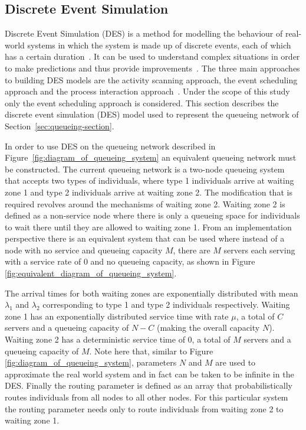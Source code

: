\subsection{Discrete Event Simulation}

Discrete Event Simulation (DES) is a method for modelling the behaviour of
real-world systems in which the system is made up of discrete events, each of
which has a certain duration~\cite{DESstewart}.
It can be used to understand complex situations in order to make predictions
and thus provide improvements~\cite{VinceGeraintBook}.
The three main approaches to building DES models are the activity scanning
approach, the event scheduling approach and the process interaction
approach~\cite{DESapproaches}.
Under the scope of this study only the event scheduling approach is considered.
This section describes the discrete event simulation (DES) model used to
represent the queueing network of Section~\ref{sec:queueing-section}.

In order to use DES on the queueing network described in
Figure~\ref{fig:diagram_of_queueing_system} an equivalent queueing network must
be constructed.
The current queueing network is a two-node queueing system that accepts two
types of individuals, where type 1 individuals arrive at waiting zone 1 and
type 2 individuals arrive at waiting zone 2.
The modification that is required revolves around the mechanisms of waiting
zone 2.
Waiting zone 2 is defined as a non-service node where there is only a queueing
space for individuals to wait there until they are allowed to waiting zone 1.
From an implementation perspective there is an equivalent system that can be
used where instead of a node with no service and queueing capacity \(M\), there
are \(M\) servers each serving with a service rate of \(0\) and no queueing
capacity, as shown in Figure \ref{fig:equivalent_diagram_of_queueing_system}.



The arrival times for both waiting zones are exponentially distributed with
mean \(\lambda_1\) and \(\lambda_2\) corresponding to type 1 and type 2
individuals respectively.
Waiting zone 1 has an exponentially distributed service time with rate \(\mu\),
a total of \(C\) servers and a queueing capacity of \(N - C\) (making the
overall capacity \(N\)). 
Waiting zone 2 has a deterministic service time of \(0\), a total of \(M\)
servers and a queueing capacity of \(M\).
Note here that, similar to Figure \ref{fig:diagram_of_queueing_system},
parameters \(N\) and \(M\) are used to approximate the real world system 
and in fact can be taken to be infinite in the DES.
Finally the routing parameter is defined as an array that probabilistically
routes individuals from all nodes to all other nodes.
For this particular system the routing parameter needs only to route individuals
from waiting zone 2 to waiting zone 1.


